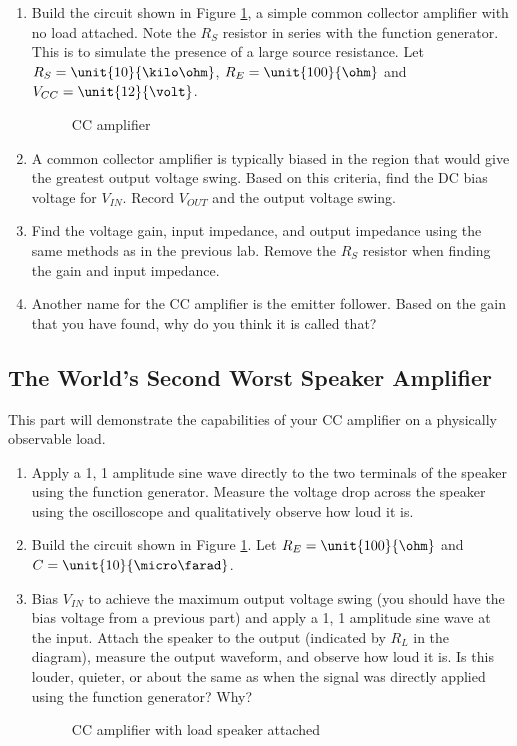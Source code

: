 \documentclass{article}
\begin{document}
\begin{enumerate}
\item Build the circuit shown in Figure \ref{rc}, a simple common collector amplifier with no load attached. Note the $R_S$ resistor in series with the function generator. This is to simulate the presence of a large source resistance. Let $R_S = \unit{10}{\kilo\ohm}$, $R_E = \unit{100}{\ohm}$ and $V_{CC} = \unit{12}{\volt}$.

	\begin{figure}[!htb]
		
		\centerline{\box\graph}
		\caption{CC amplifier}
		\label{rc}
	\end{figure}

\item A common collector amplifier is typically biased in the region that would give the greatest output voltage swing. Based on this criteria, find the DC bias voltage for $V_{IN}$. Record $V_{OUT}$ and the output voltage swing.
\item Find the voltage gain, input impedance, and output impedance using the same methods as in the previous lab. Remove the $R_S$ resistor when finding the gain and input impedance. 
\item Another name for the CC amplifier is the emitter follower. Based on the gain that you have found, why do you think it is called that?
\end{enumerate}

\subsection{The World's Second Worst Speaker Amplifier}
This part will demonstrate the capabilities of your CC amplifier on a physically observable load. 
\begin{enumerate}
\item Apply a \unit{1}{\kilo\hertz}, \unit{1}{\volt} amplitude sine wave directly to the two terminals of the speaker using the function generator. Measure the voltage drop across the speaker using the oscilloscope and qualitatively observe how loud it is.
\item Build the circuit shown in Figure \ref{rc}. Let $R_E = \unit{100}{\ohm}$ and $C = \unit{10}{\micro\farad}$.
\item Bias $V_{IN}$ to achieve the maximum output voltage swing (you should have the bias voltage from a previous part) and apply a \unit{1}{\kilo\hertz}, \unit{1}{\volt} amplitude sine wave at the input. Attach the speaker to the output (indicated by $R_L$ in the diagram), measure the output waveform, and observe how loud it is. Is this louder, quieter, or about the same as when the signal was directly applied using the function generator? Why? 

	\begin{figure}[!htb]
		
		\centerline{\box\graph}
		\caption{CC amplifier with load speaker attached}
		\label{ccload}
	\end{figure}

\end{enumerate}
\end{document}
